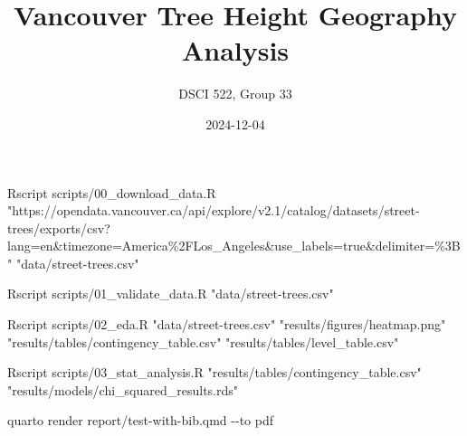 \documentclass[
  letterpaper,
  DIV=11,
  numbers=noendperiod]{scrartcl}
\title{Vancouver Tree Height Geography Analysis}
\author{DSCI 522, Group 33}
\date{2024-12-04}
\newenvironment{Shaded}{\begin{snugshade}}{\end{snugshade}}
\newcommand{\AttributeTok}[1]{\textcolor[rgb]{0.40,0.45,0.13}{#1}}
\newcommand{\ExtensionTok}[1]{\textcolor[rgb]{0.00,0.23,0.31}{#1}}
\newcommand{\NormalTok}[1]{\textcolor[rgb]{0.00,0.23,0.31}{#1}}
\newcommand{\StringTok}[1]{\textcolor[rgb]{0.13,0.47,0.30}{#1}}
\renewcommand*\contentsname{Table of contents}
\newcommand\contentsname{Table of contents}
\begin{document}
\maketitle

\renewcommand*\contentsname{Table of contents}
{
\hypersetup{linkcolor=}
\setcounter{tocdepth}{3}
\tableofcontents
}

\begin{Shaded}
\begin{Highlighting}[]
\ExtensionTok{Rscript}\NormalTok{ scripts/00\_download\_data.R }\StringTok{"https://opendata.vancouver.ca/api/explore/v2.1/catalog/datasets/street{-}trees/exports/csv?lang=en\&timezone=America\%2FLos\_Angeles\&use\_labels=true\&delimiter=\%3B"} \StringTok{"data/street{-}trees.csv"}
\end{Highlighting}
\end{Shaded}

\begin{Shaded}
\begin{Highlighting}[]
\ExtensionTok{Rscript}\NormalTok{ scripts/01\_validate\_data.R }\StringTok{"data/street{-}trees.csv"}
\end{Highlighting}
\end{Shaded}

\begin{Shaded}
\begin{Highlighting}[]
\ExtensionTok{Rscript}\NormalTok{ scripts/02\_eda.R }\StringTok{"data/street{-}trees.csv"} \StringTok{"results/figures/heatmap.png"} \StringTok{"results/tables/contingency\_table.csv"} \StringTok{"results/tables/level\_table.csv"}
\end{Highlighting}
\end{Shaded}

\begin{Shaded}
\begin{Highlighting}[]
\ExtensionTok{Rscript}\NormalTok{ scripts/03\_stat\_analysis.R }\StringTok{"results/tables/contingency\_table.csv"} \StringTok{"results/models/chi\_squared\_results.rds"}
\end{Highlighting}
\end{Shaded}

\begin{Shaded}
\begin{Highlighting}[]
\ExtensionTok{quarto}\NormalTok{ render report/test{-}with{-}bib.qmd }\AttributeTok{{-}{-}to}\NormalTok{ pdf}
\end{Highlighting}
\end{Shaded}
\end{document}
